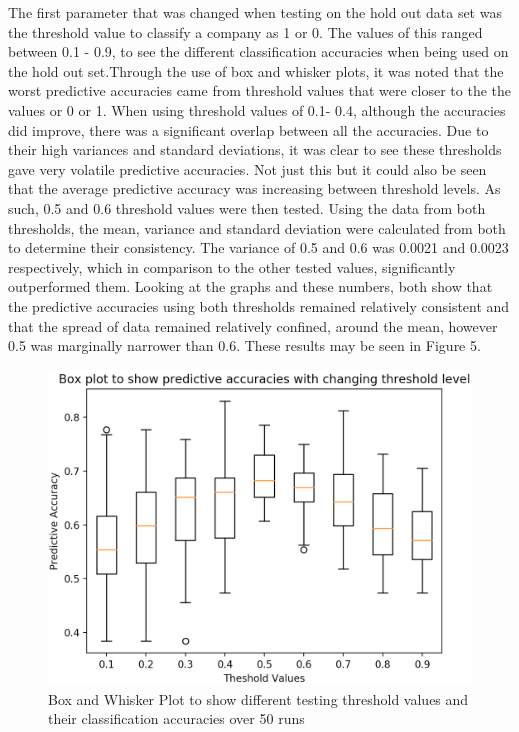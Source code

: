 \documentclass[11pt]{article}
\begin{document}
The first parameter that was changed when testing on the hold out data set was the threshold value to classify a company as 1 or 0. The values of this ranged between 0.1 - 0.9, to see the different classification accuracies when being used on the hold out set.Through the use of box and whisker plots, it was noted that the worst predictive accuracies came from threshold values that were closer to the the values or 0 or 1. When using threshold values of 0.1- 0.4, although the accuracies did improve, there was a significant overlap between all the accuracies. Due to their high variances and standard deviations, it was clear to see these thresholds gave very volatile predictive accuracies. Not just this but it could also be seen that the average predictive accuracy was increasing between threshold levels. As such, 0.5 and 0.6 threshold values were then tested. Using the data from both thresholds, the mean, variance and standard deviation were calculated from both to determine their consistency. The variance of 0.5 and 0.6 was 0.0021 and 0.0023 respectively, which in comparison to the other tested values, significantly outperformed them. Looking at the graphs and these numbers, both show that the predictive accuracies using both thresholds remained relatively consistent and that the spread of data remained relatively confined, around the mean, however 0.5 was marginally narrower than 0.6. These results may be seen in Figure 5. 
\begin{figure}[h]
\centering
\includegraphics[scale = .40]{thresh}
\caption{Box and Whisker Plot to show different testing threshold values and their classification accuracies over 50 runs} 
\end{figure}
\end{document}
